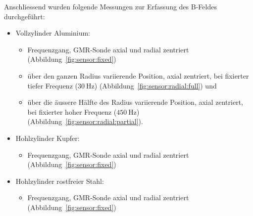 Anschliessend   wurden  folgende   Messungen   zur   Erfassung  des   B-Feldes
durchgef\"uhrt:

\begin{itemize}
    \item
        Vollzylinder Aluminium:
        \begin{itemize}
            \item
                Frequenzgang,   GMR-Sonde    axial   und    radial   zentriert
                (Abbildung~\ref{fig:sensor:fixed})
            \item
                \"uber   den  ganzen   Radius   variierende  Position,   axial
                zentriert, bei  fixierter tiefer  Frequenz ($\SI{30}{\hertz}$)
                (Abbildung~\ref{fig:sensor:radial:full}) und
            \item
                \"uber     die      \"aussere     H\"alfte      des     Radius
                variierende      Position,      axial      zentriert,      bei
                fixierter       hoher      Frequenz       ($\SI{450}{\hertz}$)
                (Abbildung~\ref{fig:sensor:radial:partial}).
        \end{itemize}
    \item
        Hohlzylinder Kupfer:
        \begin{itemize}
            \item
                Frequenzgang,   GMR-Sonde    axial   und    radial   zentriert
                (Abbildung~\ref{fig:sensor:fixed})
        \end{itemize}
    \item
        Hohlzylinder rostfreier Stahl:
        \begin{itemize}
            \item
                Frequenzgang,   GMR-Sonde    axial   und    radial   zentriert
                (Abbildung~\ref{fig:sensor:fixed})
        \end{itemize}
\end{itemize}

\begin{minipage}[t]{.33\textwidth}
    \vspace{0mm}
    \resizebox{\textwidth}{!}{}
    \label{fig:sensor:fixed}
\end{minipage}%
\begin{minipage}[t]{.33\textwidth}
    \vspace{0mm}
    \resizebox{\textwidth}{!}{}
    \label{fig:sensor:radial:full}
\end{minipage}%
\begin{minipage}[t]{.33\textwidth}
    \vspace{0mm}
    \resizebox{\textwidth}{!}{}
    \label{fig:sensor:radial:partial}
\end{minipage}


